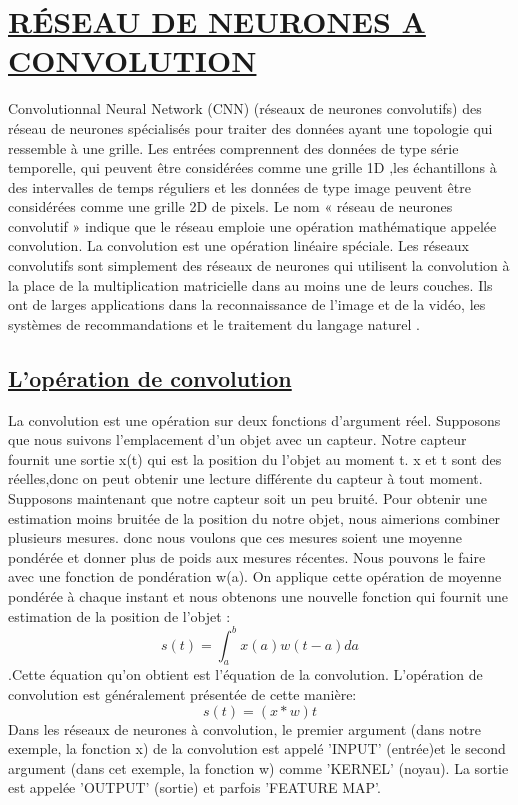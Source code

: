 \documentclass[11pt]{article}
\begin{document}
\section{\underline{RÉSEAU DE NEURONES A CONVOLUTION}}
Convolutionnal Neural Network (CNN) (réseaux de neurones convolutifs) des réseau de neurones spécialisés pour traiter des données ayant une topologie qui ressemble à une grille. Les entrées comprennent des données de type série temporelle, qui peuvent être considérées comme une grille 1D ,les échantillons à des intervalles de temps réguliers et les données de type image peuvent être considérées comme une grille 2D de pixels. Le nom « réseau de neurones convolutif » indique que le réseau emploie
une opération mathématique appelée convolution. La convolution est une opération linéaire spéciale. Les réseaux convolutifs sont simplement des réseaux de neurones qui utilisent la convolution à la place de la
multiplication matricielle dans au moins une de leurs couches.
Ils ont de larges applications dans la reconnaissance de l’image et de la vidéo, les systèmes de recommandations et le traitement du langage naturel .
\subsection{\underline{L’opération de convolution}}
La convolution est une opération sur deux fonctions d’argument réel. Supposons que nous suivons l’emplacement d’un objet avec un capteur. Notre capteur fournit une sortie x(t) qui est la position du l'objet au moment t. x et t sont des réelles,donc on peut obtenir une lecture différente du capteur à tout moment.
Supposons maintenant que notre capteur soit un peu bruité. Pour obtenir une estimation moins bruitée de la position du notre objet, nous aimerions combiner plusieurs mesures. donc nous voulons que ces mesures soient une moyenne pondérée et donner plus de poids aux mesures récentes. Nous pouvons le faire avec une fonction de pondération w(a). On applique cette opération de moyenne pondérée à chaque instant et nous obtenons une nouvelle fonction qui fournit une estimation de la position de l'objet : \newline $$s(t) =  \int_a^b  x(a)w(t-a)da$$ .Cette équation qu'on obtient est l’équation de la convolution. L’opération de convolution est généralement présentée  de cette manière:  \newline $$s(t) =   (x * w)t$$  Dans les réseaux de neurones à convolution, le premier argument (dans notre exemple, la fonction x) de la convolution est appelé 'INPUT' (entrée)et le second argument (dans cet exemple, la fonction w) comme 'KERNEL' (noyau). La sortie est appelée 'OUTPUT' (sortie) et parfois 'FEATURE MAP'.
\end{document}
